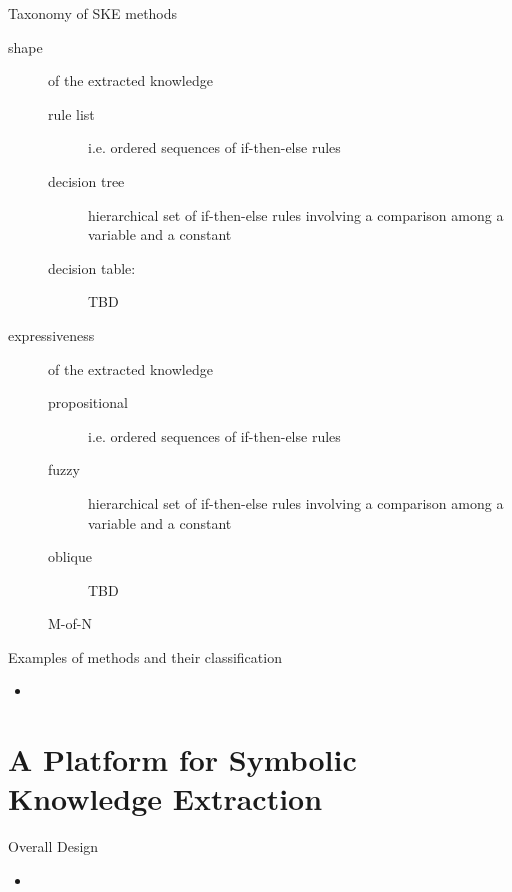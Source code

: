 \documentclass[presentation]{beamer}\mode<presentation>{\usetheme{AMSBolognaFC}}
\begin{document}
\begin{frame}[allowframebreaks]{Taxonomy of SKE methods}
\begin{description}
        \medskip

        \item[shape] of the extracted knowledge
        \begin{description}
            \item[rule list] i.e. ordered sequences of if-then-else rules
            \item[decision tree] hierarchical set of if-then-else rules involving a comparison among a variable and a constant   
            \item[decision table:] TBD
        \end{description} 

        \medskip

        \item[expressiveness] of the extracted knowledge
        \begin{description}
            \item[propositional] i.e. ordered sequences of if-then-else rules
            \item[fuzzy] hierarchical set of if-then-else rules involving a comparison among a variable and a constant   
            \item[oblique] TBD
            \item[M-of-N] 
        \end{description} 

    \end{description}
\end{frame}

\begin{frame}{Examples of methods and their classification}
    \begin{itemize}
        \item 
    \end{itemize}
\end{frame}

\section{A Platform for Symbolic Knowledge Extraction}

\begin{frame}{Overall Design}
    \begin{itemize}
        \item 
    \end{itemize}
\end{frame}
\end{document}
